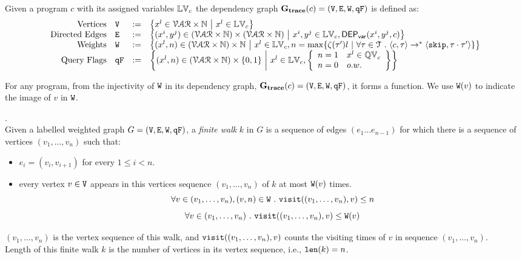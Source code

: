 \begin{defn}
\label{def:trace_graph}
Given a program ${c}$ with its assigned variables $\mathbb{LV}_c$ 
the dependency graph $\mathtt{\bf{G_{trace}}}({c}) = (\mathtt{V}, \mathtt{E}, \mathtt{W}, \mathtt{qF})$ is defined as:
%
\[
\begin{array}{rlcl}
  \text{Vertices} &
  \vertxs & := & \left\{ 
  x^l \in \mathcal{VAR} \times \mathbb{N} 
  ~ \middle\vert ~ x^l \in \lvar_{c}
  \right\}
  \\
  \text{Directed Edges} &
  \edges & := & 
  \left\{ 
  (x^i, y^j) \in (\mathcal{VAR} \times \mathbb{N}) \times (\mathcal{VAR} \times \mathbb{N})
  ~ \middle\vert ~
  x^i, y^j \in \lvar_{{c}}, \vardep(x^i, y^j, c)
  
  \right\}
  \\
  \text{Weights} &
  \weights & := & 
  \left\{ 
  (x^l, n) \in (\mathcal{VAR} \times \mathbb{N}) \times \mathbb{N}
  ~ \middle\vert ~ 
  x^l \in \lvar_{c},
  n = \max \left\{ \vcounter(\vtrace') l ~ \middle\vert~
  \forall \vtrace \in \mathcal{T} \st \config{{c}, \trace} \to^{*} \config{\eskip, \trace\cdot\vtrace'} 
   \right\}
  \right\}
  \\
  \text{Query Flags} &
  \qflag & := & 
  \left\{(x^l, n)  \in( \mathcal{VAR} \times \mathbb{N} ) \times \{0, 1\} 
  ~ \middle\vert ~
   x^l \in \lvar_{c},
   \left\{
  \begin{array}{ll}
  n = 1 & x^l \in \qvar_{c} \\ 
  n = 0 & o.w.
  \end{array}
  \right\}
  \right\}
\end{array}
\]
\end{defn}
%
For any program, from the injectivity of $\mathtt{W}$ in its dependency graph, $\mathtt{\bf{G_{trace}}}({c}) = (\mathtt{V}, \mathtt{E}, \mathtt{W}, \mathtt{qF})$, 
it forms a function. We use $\mathtt{W}(v)$ to indicate the image of $v$ in $\mathtt{W}$.
%
\begin{defn}.
\label{def:finitewalk}
\\
Given a labelled weighted graph $G = (\mathtt{V}, \mathtt{E}, \mathtt{W}, \mathtt{qF})$, a \emph{finite walk} $k$ in $G$ is a sequence of edges $(e_1 \ldots e_{n - 1})$ 
for which there is a sequence of vertices $(v_1, \ldots, v_{n})$ such that:
\begin{itemize}
    \item $e_i = (v_{i},v_{i + 1})$ for every $1 \leq i < n$.
    \item every vertex $v \in \mathtt{V}$ appears in this vertices sequence $(v_1, \ldots, v_{n})$ of $k$ at most 
    $\mathtt{W}(v)$ times.  
    \[
      \forall v \in (v_1, \ldots, v_{n}), (v, n) \in \mathtt{W} ~.~ 
      \mathtt{visit}((v_1, \ldots, v_{n}), v) \leq n
      \]
      \[
        \forall v \in (v_1, \ldots, v_{n})~.~ 
        \mathtt{visit}((v_1, \ldots, v_{n}), v) \leq \mathtt{W}(v)
      \]
\end{itemize}
$(v_1, \ldots, v_{n})$ is the vertex sequence of this walk, and $\mathtt{visit}((v_1, \ldots, v_{n}), v) $ counts the visiting times of
$v$ in sequence $(v_1, \ldots, v_{n})$.
\\
%
Length of this finite walk $k$ is the number of vertices in its vertex sequence, i.e., $\mathtt{len}(k) = n$.
\end{defn}
